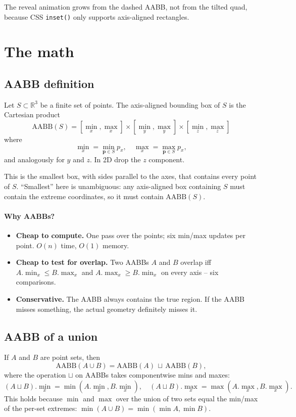 \documentclass{article}
\begin{document}
The reveal animation grows from the dashed AABB, not from the tilted quad, because CSS
\texttt{inset()} only supports axis-aligned rectangles.

\section{The math}

\subsection{AABB definition}

Let $S \subset \mathbb{R}^3$ be a finite set of points. The axis-aligned bounding box of
$S$ is the Cartesian product
\[
  \mathrm{AABB}(S) = [\min_x, \max_x] \times [\min_y, \max_y] \times [\min_z, \max_z]
\]
where
\[
  \min_x = \min_{\mathbf{p} \in S} p_x,
  \quad \max_x = \max_{\mathbf{p} \in S} p_x,
\]
and analogously for $y$ and $z$. In 2D drop the $z$ component.

This is the smallest box, with sides parallel to the axes, that contains every point of
$S$. ``Smallest'' here is unambiguous: any axis-aligned box containing $S$ must contain
the extreme coordinates, so it must contain $\mathrm{AABB}(S)$.

\paragraph{Why AABBs?}
\begin{itemize}
  \item \textbf{Cheap to compute.} One pass over the points; six min/max updates per
    point. $O(n)$ time, $O(1)$ memory.
  \item \textbf{Cheap to test for overlap.} Two AABBs $A$ and $B$ overlap iff
    $A.\min_x \le B.\max_x$ and $A.\max_x \ge B.\min_x$ on every axis -- six comparisons.
  \item \textbf{Conservative.} The AABB always contains the true region. If the AABB
    misses something, the actual geometry definitely misses it.
\end{itemize}

\subsection{AABB of a union}

If $A$ and $B$ are point sets, then
\[
  \mathrm{AABB}(A \cup B) = \mathrm{AABB}(A) \,\sqcup\, \mathrm{AABB}(B),
\]
where the operation $\sqcup$ on AABBs takes componentwise mins and maxes:
\[
  (A \sqcup B).\min_x = \min(A.\min_x, B.\min_x),
  \quad (A \sqcup B).\max_x = \max(A.\max_x, B.\max_x).
\]
This holds because $\min$ and $\max$ over the union of two sets equal the min/max of the
per-set extremes:
$\min(A \cup B) = \min(\min A, \min B)$.
\end{document}
